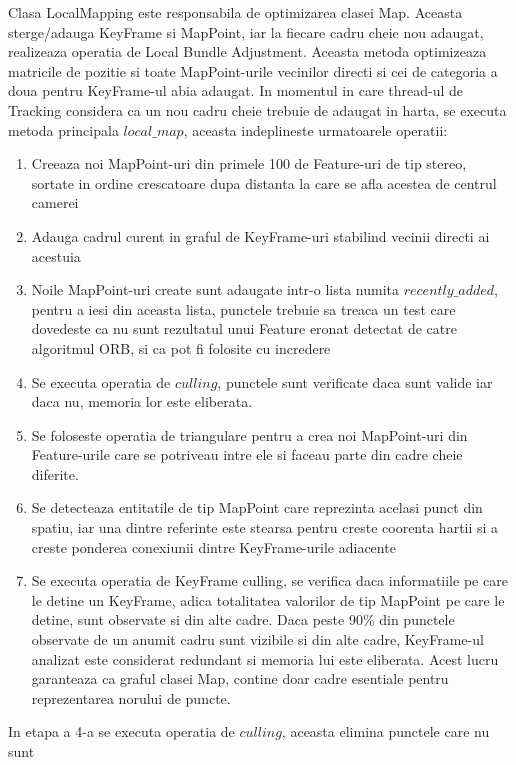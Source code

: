 \documentclass[12pt,a4paper]{report}
\begin{document}
Clasa LocalMapping este responsabila de optimizarea clasei Map. Aceasta sterge/adauga KeyFrame 
si MapPoint, iar la fiecare cadru cheie nou adaugat, realizeaza operatia de Local Bundle 
Adjustment. Aceasta metoda optimizeaza matricile de pozitie si toate MapPoint-urile vecinilor 
directi si cei de categoria a doua pentru KeyFrame-ul abia adaugat. In momentul in care 
thread-ul de Tracking considera ca un nou cadru cheie trebuie de adaugat in harta, se executa
metoda principala $ local\_map $, aceasta indeplineste urmatoarele operatii:
\begin{enumerate}
    \item Creeaza noi MapPoint-uri din primele 100 de Feature-uri de tip stereo, 
sortate in ordine crescatoare dupa distanta la care se afla acestea de centrul camerei  
    \item Adauga cadrul curent in graful de KeyFrame-uri stabilind vecinii directi ai
acestuia 
    \item Noile MapPoint-uri create sunt adaugate intr-o lista numita $ recently\_added $,
pentru a iesi din aceasta lista, punctele trebuie sa treaca un test care dovedeste ca 
nu sunt rezultatul unui Feature eronat detectat de catre algoritmul ORB, si ca pot fi 
folosite cu incredere
    \item Se executa operatia de $ culling $, punctele sunt verificate daca sunt valide iar
daca nu, memoria lor este eliberata.
    \item Se foloseste operatia de triangulare pentru a crea noi MapPoint-uri din 
Feature-urile care se potriveau intre ele si faceau parte din cadre cheie diferite.
    \item Se detecteaza entitatile de tip MapPoint care reprezinta acelasi punct
din spatiu, iar una dintre referinte este stearsa pentru creste coorenta hartii si 
a creste ponderea conexiunii dintre KeyFrame-urile adiacente    
    \item Se executa operatia de KeyFrame culling, se verifica daca informatiile pe 
care le detine un KeyFrame, adica totalitatea valorilor de tip MapPoint pe care le 
detine, sunt observate si din alte cadre. Daca peste 90\% din punctele observate de un 
anumit cadru sunt vizibile si din alte cadre, KeyFrame-ul analizat este considerat redundant
si memoria lui este eliberata. Acest lucru garanteaza ca graful clasei Map, contine 
doar cadre esentiale pentru reprezentarea norului de puncte. 
\end{enumerate}
In etapa a 4-a se executa operatia de $ culling $, aceasta elimina punctele care nu sunt
\end{document}
